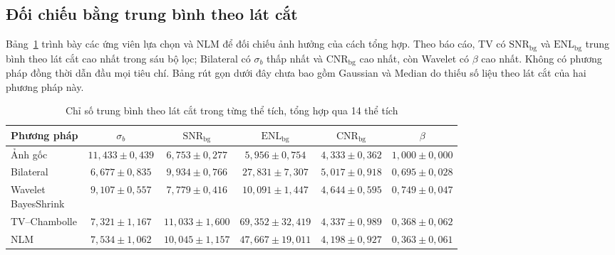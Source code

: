 \documentclass[14pt,a4paper,oneside]{extreport}
\begin{document}
\subsection{Đối chiếu bằng trung bình theo lát cắt}
Bảng~\ref{tab:denoise-14-slices} trình bày các ứng viên lựa chọn
và NLM để đối chiếu ảnh hưởng của cách tổng hợp. Theo báo cáo,
TV có $\mathrm{SNR}_{\mathrm{bg}}$ và $\mathrm{ENL}_{\mathrm{bg}}$
trung bình theo lát cắt cao nhất trong sáu bộ lọc; Bilateral có
$\sigma_b$ thấp nhất và $\mathrm{CNR}_{\mathrm{bg}}$ cao nhất,
còn Wavelet có $\beta$ cao nhất. Không có phương pháp đồng thời
dẫn đầu mọi tiêu chí. Bảng rút gọn dưới đây chưa bao gồm Gaussian
và Median do thiếu số liệu theo lát cắt của hai phương pháp này.

\begin{table}[htbp]
 \centering
 \caption{Chỉ số trung bình theo lát cắt trong từng thể tích, tổng hợp qua 14 thể tích}
 \label{tab:denoise-14-slices}
 \begingroup
 \fontsize{11.5pt}{13.8pt}\selectfont
 \setlength{\tabcolsep}{3pt}
 \begin{tabular}{@{}lccccc@{}}
 \toprule
 Phương pháp & $\sigma_b$ & $\mathrm{SNR}_{\mathrm{bg}}$ & $\mathrm{ENL}_{\mathrm{bg}}$ & $\mathrm{CNR}_{\mathrm{bg}}$ & $\beta$\\
 \midrule
 Ảnh gốc & $11{,}433\pm0{,}439$ & $6{,}753\pm0{,}277$ & $5{,}956\pm0{,}754$ & $4{,}333\pm0{,}362$ & $1{,}000\pm0{,}000$\\
 Bilateral & $6{,}677\pm0{,}835$ & $9{,}934\pm0{,}766$ & $27{,}831\pm7{,}307$ & $5{,}017\pm0{,}918$ & $0{,}695\pm0{,}028$\\
 \shortstack[l]{Wavelet\\BayesShrink} & $9{,}107\pm0{,}557$ & $7{,}779\pm0{,}416$ & $10{,}091\pm1{,}447$ & $4{,}644\pm0{,}595$ & $0{,}749\pm0{,}047$\\
 TV--Chambolle & $7{,}321\pm1{,}167$ & $11{,}033\pm1{,}600$ & $69{,}352\pm32{,}419$ & $4{,}337\pm0{,}989$ & $0{,}368\pm0{,}062$\\
 NLM & $7{,}534\pm1{,}062$ & $10{,}045\pm1{,}157$ & $47{,}667\pm19{,}011$ & $4{,}198\pm0{,}927$ & $0{,}363\pm0{,}061$\\
 \bottomrule
 \end{tabular}
 \endgroup
 \par{}
\end{table}
\end{document}
